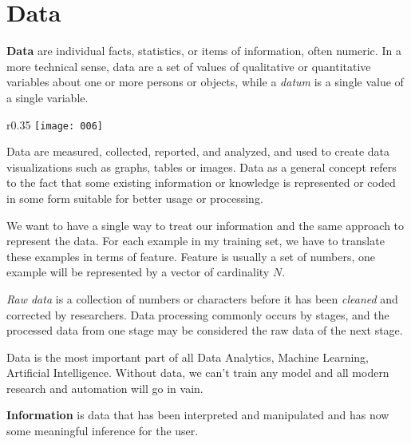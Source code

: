 \section{Data}

\textbf{Data} are individual facts, statistics, or items of information, often numeric. In a more technical sense, data are a set of values of qualitative or quantitative variables about one or more persons or objects, while a \emph{datum} is a single value of a single variable.

\begin{wrapfigure}{r}{0.35\textwidth}
      \texttt{[image: 006]}
\end{wrapfigure}
Data are measured, collected, reported, and analyzed, and used to create data visualizations such as graphs, tables or images. Data as a general concept refers to the fact that some existing information or knowledge is represented or coded in some form suitable for better usage or processing.

We want to have a single way to treat our information and the same approach to represent the data. For each example in my training set, we have to translate these examples in terms of feature. Feature is usually a set of numbers, one example will be represented by a vector of cardinality \(N\).

\emph{Raw data} is a collection of numbers or characters before it has been \emph{cleaned} and corrected by researchers. Data processing commonly occurs by stages, and the processed data from one stage may be considered the raw data of the next stage.

Data is the most important part of all Data Analytics, Machine Learning, Artificial Intelligence. Without data, we can't train any model and all modern research and automation will go in vain.

\textbf{Information} is data that has been interpreted and manipulated and has now some meaningful inference for the user.


